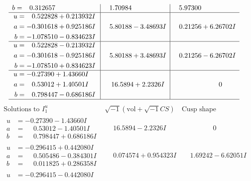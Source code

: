 \documentclass[1p]{elsarticle_modified}
\theoremstyle{definition}
\newcommand{\I}{\sqrt{-1}}
\begin{document}
$$\begin{array}{c|c|c}
\begin{aligned}
b &= \phantom{-}0.312657\phantom{ +0.000000I}\end{aligned}
 & \phantom{-}1.70984\phantom{ +0.000000I} & \phantom{-}5.97300\phantom{ +0.000000I} \\ \hline\begin{aligned}
u &= \phantom{-}0.522828 + 0.213932 I \\
a &= -0.301618 + 0.925186 I \\
b &= -1.078510 - 0.834623 I\end{aligned}
 & \phantom{-}5.80188 - 3.48693 I & \phantom{-}0.21256 + 6.26702 I \\ \hline\begin{aligned}
u &= \phantom{-}0.522828 - 0.213932 I \\
a &= -0.301618 - 0.925186 I \\
b &= -1.078510 + 0.834623 I\end{aligned}
 & \phantom{-}5.80188 + 3.48693 I & \phantom{-}0.21256 - 6.26702 I \\ \hline\begin{aligned}
u &= -0.27390 + 1.43660 I \\
a &= \phantom{-}0.53012 + 1.40501 I \\
b &= \phantom{-}0.798447 - 0.686186 I\end{aligned}
 & \phantom{-}16.5894 + 2.2326 I & \phantom{-0.000000 } 0\\
 \hline 
 \end{array}$$\newpage$$\begin{array}{c|c|c}  
\text{Solutions to }I^u_{1}& \I (\text{vol} + \sqrt{-1}CS) & \text{Cusp shape}\\
 \hline 
\begin{aligned}
u &= -0.27390 - 1.43660 I \\
a &= \phantom{-}0.53012 - 1.40501 I \\
b &= \phantom{-}0.798447 + 0.686186 I\end{aligned}
 & \phantom{-}16.5894 - 2.2326 I & \phantom{-0.000000 } 0 \\ \hline\begin{aligned}
u &= -0.296415 + 0.442080 I \\
a &= \phantom{-}0.505486 - 0.384301 I \\
b &= \phantom{-}0.011825 + 0.286358 I\end{aligned}
 & \phantom{-}0.074574 + 0.954323 I & \phantom{-}1.69242 - 6.62051 I \\ \hline\begin{aligned}
u &= -0.296415 - 0.442080 I \\

\end{aligned}
\end{array}$$
\end{document}
